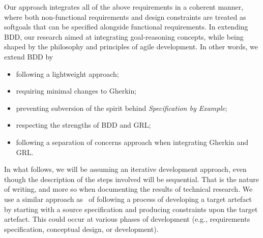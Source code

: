 \documentclass[dissertation,final]{softeng}
\begin{document}
\begin{table}[h!]
\caption[Three types of requirements]{Three types of requirements~\citep{Leffingwell2011}}
\label{tb:three_req_types}
\setlength{\extrarowheight}{1.8pt}
\centering
{}
\end{table}

Our approach integrates all of the above requirements in a coherent manner, where both non-functional requirements and design constraints are treated as softgoals that can be specified alongside functional requirements. In extending BDD, our research aimed at integrating goal-reasoning concepts, while being shaped by the philosophy and principles of agile development. In other words, we extend BDD by 

\begin{itemize}
\item following a lightweight approach;
\item requiring minimal changes to Gherkin;
\item preventing subversion of the spirit behind \emph{Specification by Example};
\item respecting the strengths of BDD and GRL;
\item following a separation of concerns approach when integrating Gherkin and GRL.
\end{itemize}

In what follows, we will be assuming an iterative development approach, even though the description of the steps involved will be sequential. That is the nature of writing, and more so when documenting the results of technical research. We use a similar approach as~\citet{Chung2000} of following a process of developing a target artefact by starting with a source specification and producing constraints upon the target artefact. This could occur at various phases of development (e.g., requirements specification, conceptual design, or development).
\end{document}
